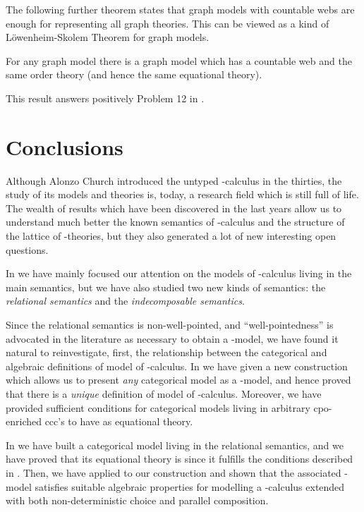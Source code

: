\documentclass[english]{llncs}
\begin{document}
The following further theorem states that graph models with countable webs are enough for representing all graph theories.
This can be viewed as a kind of L\"{o}wenheim-Skolem Theorem for graph models.

\begin{theorem}\label{LSKgen} \cite[Thm.~5.3.2]{ManzonettoTh} For any graph model  there is a graph model  which has a countable web and the same order theory 
(and hence the same equational theory).
\end{theorem}

This result answers positively Problem 12 in \cite{Berline06}.



\section*{Conclusions}

Although Alonzo Church introduced the untyped -calculus in the thirties, the study of its models and theories is, today, 
a research field which is still full of life.
The wealth of results which have been discovered in the last years allow us to understand much better the known semantics of -calculus 
and the structure of the lattice of -theories, but they also generated a lot of new interesting open questions.

In \cite{ManzonettoTh} we have mainly focused our attention on the models of -calculus living in the main semantics, 
but we have also studied two new kinds of semantics: the {\em relational semantics} and the {\em indecomposable semantics}.

Since the relational semantics is non-well-pointed, and ``well-pointedness'' is advocated in the literature as necessary
to obtain a -model, we have found it natural to reinvestigate, first, the relationship between the categorical and algebraic definitions of 
model of -calculus. 
In \cite[Chapter~2]{ManzonettoTh} we have given a new construction which allows us to present {\em any} categorical model 
as a -model, and hence proved that there is a {\em unique} definition of model of -calculus. 
Moreover, we have provided sufficient conditions for categorical models living in arbitrary cpo-enriched ccc's to have 
as equational theory.

In \cite[Chapter~3]{ManzonettoTh} we have built a categorical model  living in the relational semantics,
and we have proved that its equational theory is  since it fulfills the conditions described in \cite[Chapter~2]{ManzonettoTh}.
Then, we have applied to  our construction and shown that the associated -model satisfies suitable algebraic properties for modelling a -calculus
extended with both non-deterministic choice and parallel composition.
\end{document}
